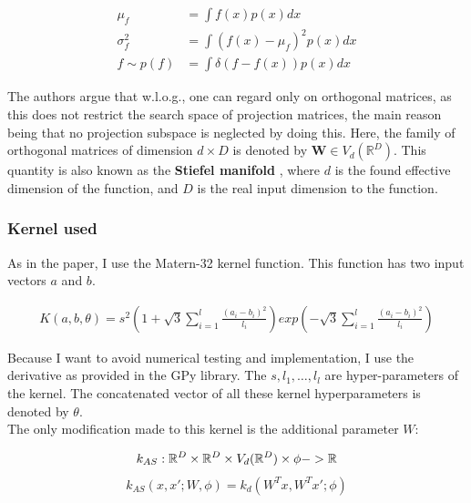 \documentclass[a4paper,12pt,twoside,openright]{report}
\begin{document}
\begin{align}
\mu_f &= \int f(x) p(x) dx \\
\sigma^2_f &= \int ( f(x) - \mu_f )^2 p(x) dx \\
f \sim p(f) &= \int \delta( f - f(x) ) p(x) dx
\end{align}

The authors argue that w.l.o.g., one can regard only on orthogonal matrices, as this does not restrict the search space of projection matrices, the main reason being that no projection subspace is neglected by doing this.
Here, the family of orthogonal matrices of dimension $d \times D$ is denoted by $\mathbf{W} \in V_d(\mathbb{R}^D) $.
This quantity is also known as the \textbf{Stiefel manifold} \citep{StiefelBayesianInference} \citep{StatisticsStiefelIntro} \citep{StiefelNonparametric}, where $d$ is the found effective dimension of the function, and $D$ is the real input dimension to the function. \\

\subsubsection{Kernel used}
As in the paper, I use the Matern-32 kernel function.
This function has two input vectors $a$ and $b$.

\begin{align}
K(a,  b, \theta) = s^2 \left( 1 + \sqrt{3} \sum_{i=1}^l \frac{(a_i - b_i)^2}{ \textit{l}_i} \right) exp\left( - \sqrt{3} \sum_{i=1}^l \frac{(a_i - b_i)^2}{ \textit{l}_i} \right)
\end{align}

Because I want to avoid numerical testing and implementation, I use the derivative as provided in the GPy library.
The $s, l_1, \ldots, l_l $ are hyper-parameters of the kernel. 
The concatenated vector of all these kernel hyperparameters is denoted by $\theta$. \\

The only modification made to this kernel is the additional parameter $W$:

\begin{equation}
k_{AS} : \mathbb{R}^D \times \mathbb{R}^D \times V_d(\mathbb{R}^D) \times \phi -> \mathbb{R} \\
\end{equation}
\begin{equation}
k_{AS} (x, x'; W, \phi) = k_d(W^T x, W^T x'; \phi)
\end{equation}
\end{document}
